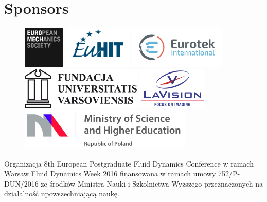 \section*{Sponsors}
\begin{figure}[H]%
	\centering
	\includegraphics[height=2cm,keepaspectratio]{logo_spons/logoEUROMECH}\hfill
	\includegraphics[height=2cm,keepaspectratio]{logo_spons/EuHIT+logo+navy}\hfill
	\includegraphics[height=2cm,keepaspectratio]{logo_spons/logo_Eurotec_kolor}\hfill
	\includegraphics[height=2cm,keepaspectratio]{logo_spons/UV_logo}\hfill
	\vspace{.5cm}
	\includegraphics[height=2cm,keepaspectratio]{logo_spons/La_vision_logo}
	\hspace{.5cm}%
	\includegraphics[height=2cm,keepaspectratio]{logo_spons/Ministry_logo}
\end{figure}


\vfill

Organizacja 8th European Postgraduate Fluid Dynamics Conference w ramach Warsaw Fluid Dynamics Week 2016 finansowana w ramach umowy 752/P-DUN/2016 ze środków Ministra Nauki
i Szkolnictwa Wyższego przeznaczonych na działalność upowszechniającą naukę.
\vspace{2cm}